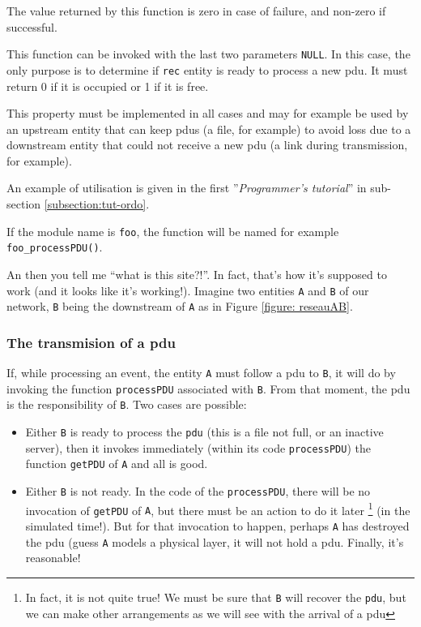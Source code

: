    The value returned by this function is zero in case of failure, and
non-zero if successful.

    This function can be invoked with the last two parameters
{\tt NULL}. In this case, the only purpose is to determine if {\tt rec}
entity is ready to process a new {\sc pdu}. It
must return 0 if it is occupied or 1 if it is free.

   This property must be implemented in all cases and may
for example be used by an upstream entity that can keep
{\sc pdu}s (a file, for example) to avoid loss due to
a downstream entity that could not receive a new {\sc pdu} (a
link during transmission, for example).

   An example of utilisation is given in the first ''{\em Programmer's tutorial}'' in sub-section \ref{subsection:tut-ordo}.

   If the module name is {\tt foo}, the function will be named for example
{\tt foo\_processPDU()}.

    An then you tell me ``what is this site?!''. In fact, that's how it's supposed to work (and it looks like it's working!). Imagine two entities {\tt A} and {\tt B} of our
network, {\tt B} being the downstream of {\tt A} as in Figure \ref{figure: reseauAB}.

%
\subsubsection{The transmision of a {\sc pdu}}

   
   If, while processing an event, the entity {\tt A} must
follow a {\sc pdu} to {\tt B}, it will do by invoking the function
\lstinline!processPDU! associated with {\tt B}. From that moment, the
{\sc} pdu is the responsibility of {\tt B}. Two cases are
possible:

\begin{itemize}
   \item Either {\tt B} is ready to process the {\tt pdu} (this is a file
      not full, or an inactive server), then it invokes
      immediately (within its code \lstinline!processPDU!) the
      function \lstinline!getPDU! of {\tt A} and all is good.
   \item Either {\tt B} is not ready. In the code of the
      \lstinline!processPDU!, there will be no invocation of
      \lstinline!getPDU! of {\tt A}, but there must be an action
      to do it later \footnote{In fact, it is not
      quite true! We must be sure that {\tt B} will
      recover the {\tt pdu}, but we can make other arrangements
      as we will see with the arrival of a {\sc pdu}} (in the simulated time!). 
      But for that invocation to happen, perhaps {\tt A} has destroyed the {\sc pdu} 
      (guess {\tt A} models a physical layer, it
      will not hold a {\sc pdu}. Finally, it's reasonable!
\end{itemize}

